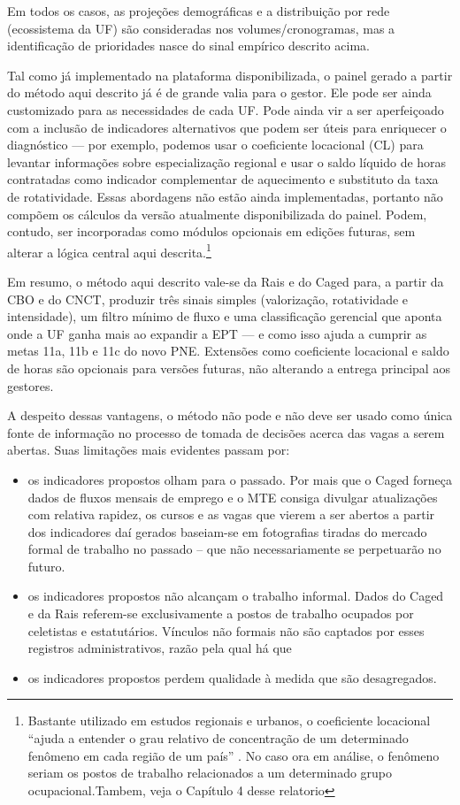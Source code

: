 Em todos os casos, as projeções demográficas e a distribuição por rede (ecossistema da UF) são consideradas nos volumes/cronogramas, mas a identificação de prioridades nasce do sinal empírico descrito acima.

Tal como já implementado na plataforma disponibilizada, o painel gerado a partir do método aqui descrito já é de grande valia para o gestor. Ele pode ser ainda customizado para as necessidades de cada UF. Pode ainda vir a ser aperfeiçoado com a inclusão de indicadores alternativos que podem ser úteis para enriquecer o diagnóstico — por exemplo, podemos usar o coeficiente locacional (CL) para levantar informações sobre especialização regional e usar o saldo líquido de horas contratadas como indicador complementar de aquecimento e substituto da taxa de rotatividade. Essas abordagens não estão ainda implementadas, portanto não compõem os cálculos da versão atualmente disponibilizada do painel. Podem, contudo, ser incorporadas como módulos opcionais em edições futuras, sem alterar a lógica central aqui descrita.\footnote{Bastante utilizado em estudos regionais e urbanos, o coeficiente locacional “ajuda a entender o grau relativo de concentração de um determinado fenômeno em cada região de um país” \parencite[430]{maciente_pereira_nascimento_2013}. No caso ora em análise, o fenômeno seriam os postos de trabalho relacionados a um determinado grupo ocupacional.Tambem, veja o Capítulo 4 desse relatorio}

Em resumo, o método aqui descrito vale-se da Rais e do Caged para, a partir da CBO e do CNCT, produzir três sinais simples (valorização, rotatividade e intensidade), um filtro mínimo de fluxo e uma classificação gerencial que aponta onde a UF ganha mais ao expandir a EPT — e como isso ajuda a cumprir as metas 11a, 11b e 11c do novo PNE. Extensões como coeficiente locacional e saldo de horas são opcionais para versões futuras, não alterando a entrega principal aos gestores.

A despeito dessas vantagens, o método não pode e não deve ser usado como única fonte de informação no processo de tomada de decisões acerca das vagas a serem abertas. Suas limitações mais evidentes passam por:

\begin{itemize}
	\item os indicadores propostos olham para o passado. Por mais que o Caged forneça dados de fluxos mensais de emprego e o MTE consiga divulgar atualizações com relativa rapidez, os cursos e as vagas que vierem a ser abertos a partir dos indicadores daí gerados baseiam-se em fotografias tiradas do mercado formal de trabalho no passado – que não necessariamente se perpetuarão no futuro.
	\item os indicadores propostos não alcançam o trabalho informal. Dados do Caged e da Rais referem-se exclusivamente a postos de trabalho ocupados por celetistas e estatutários. Vínculos não formais não são captados por esses registros administrativos, razão pela qual há que
	\item os indicadores propostos perdem qualidade à medida que são desagregados.
\end{itemize}

